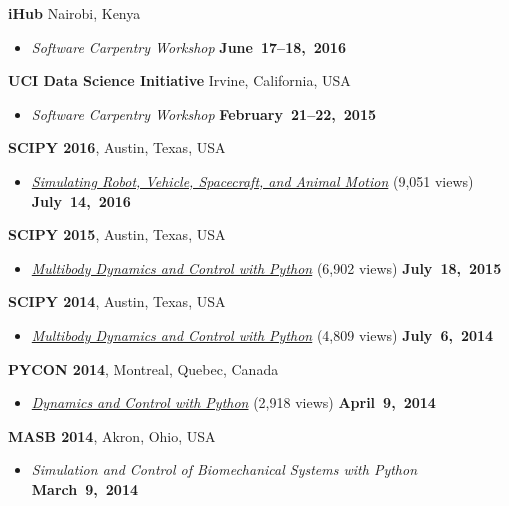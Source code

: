 \documentclass[10pt]{article}
\newenvironment{outerlist}[1][\enskip\textbullet]%
        {\begin{itemize}[#1]}{\end{itemize}%
         \vspace{-.6\baselineskip}}
\newcommand{\blankline}{\quad\pagebreak[2]}
\begin{document}
\blankline

\textbf{iHub} Nairobi, Kenya
\begin{outerlist}
  \item[] \textit{Software Carpentry Workshop}
    \hfill \textbf{June~17--18,~2016}
\end{outerlist}

\blankline

\textbf{UCI Data Science Initiative} Irvine, California, USA
\begin{outerlist}
  \item[] \textit{ Software Carpentry Workshop}
    \hfill \textbf{February~21--22,~2015}
\end{outerlist}

\blankline

\textbf{SCIPY 2016}, Austin, Texas, USA
\begin{outerlist}
  \item[] \href{https://youtu.be/r4piIKV4sDw}{\textit{Simulating Robot,
    Vehicle, Spacecraft, and Animal Motion}} (9,051 views)
    \hfill \textbf{July~14,~2016}
\end{outerlist}

\blankline

\textbf{SCIPY 2015}, Austin, Texas, USA
\begin{outerlist}
  \item[] \href{https://youtu.be/mdo2NYtA-xY}{\textit{Multibody Dynamics and
    Control with Python}} (6,902 views)
    \hfill \textbf{July~18,~2015}
\end{outerlist}

\blankline

\textbf{SCIPY 2014}, Austin, Texas, USA
\begin{outerlist}
  \item[] \href{https://youtu.be/lWbeuDwYVto}{\textit{Multibody Dynamics and
    Control with Python}} (4,809 views) \hfill \textbf{July~6,~2014}
\end{outerlist}

\blankline

\textbf{PYCON 2014}, Montreal, Quebec, Canada
\begin{outerlist}
  \item[] \href{https://youtu.be/IoMR-ESzqw8}{\textit{Dynamics and Control with
    Python}} (2,918 views)
    \hfill \textbf{April~9,~2014}
\end{outerlist}

\blankline

\textbf{MASB 2014}, Akron, Ohio, USA
\begin{outerlist}
  \item[] \textit{Simulation and Control of Biomechanical Systems with Python}
    \hfill \textbf{March~9,~2014}
\end{outerlist}
\end{document}
